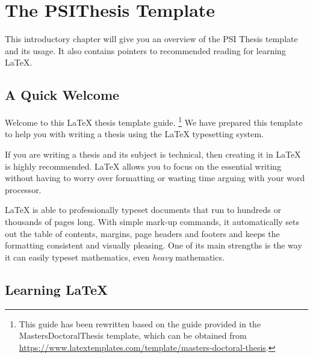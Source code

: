 
\chapter{The PSIThesis Template} %

\label{Chapter1} %


\newcommand{\keyword}[1]{\textbf{#1}}
\newcommand{\tabhead}[1]{\textbf{#1}}
\newcommand{\code}[1]{\texttt{#1}}
\newcommand{\file}[1]{\texttt{#1}}
\newcommand{\option}[1]{\texttt{\itshape#1}}


This introductory chapter will give you an overview of the PSI Thesis template and its usage.
It also contains pointers to recommended reading for learning \LaTeX{}.

\section{A Quick Welcome}

Welcome to this LaTeX thesis template guide.%
\footnote{This guide has been rewritten based on the guide provided in the MastersDoctoralThesis template, which can be obtained from \url{https://www.latextemplates.com/template/masters-doctoral-thesis}.}
We have prepared this template to help you with writing a thesis using the LaTeX typesetting system.

If you are writing a thesis and its subject is technical, then creating it in LaTeX is highly recommended. LaTeX allows you to focus on the essential writing without having to worry over formatting or wasting time arguing with your word processor.

LaTeX is able to professionally typeset documents that run to hundreds or thousands of pages long. With simple mark-up commands, it automatically sets out the table of contents, margins, page headers and footers and keeps the formatting consistent and visually pleasing. One of its main strengths is the way it can easily typeset mathematics, even \emph{heavy} mathematics.


\section{Learning LaTeX}

